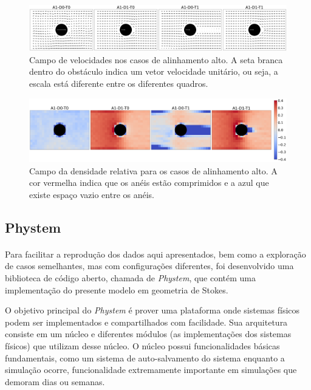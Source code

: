 \documentclass{article}
\theoremstyle{definition}
\begin{document}
\begin{figure}[h]
    \centering
    \includegraphics[width=\linewidth]{figuras/output_measurements/vel_high_align.png}
    \caption{Campo de velocidades nos casos de alinhamento alto. A seta branca dentro do obstáculo indica um vetor velocidade unitário, ou seja, a escala está diferente entre os diferentes quadros.}
    \label{fig:output_vel_high_align}
\end{figure}

\begin{figure}[h]
    \centering
    \includegraphics[width=\linewidth]{figuras/output_measurements/den_high_align.png}
    \caption{Campo da densidade relativa para os casos de alinhamento alto. A cor vermelha indica que os anéis estão comprimidos e a azul que existe espaço vazio entre os anéis.}
    \label{fig:output_rel_den_high_align}
\end{figure}

\FloatBarrier

\subsection{Phystem}
\paragraph{}
Para facilitar a reprodução dos dados aqui apresentados, bem como a exploração de casos semelhantes, mas com configurações diferentes, foi desenvolvido uma biblioteca de código aberto, chamada de \textit{Phystem}, que contém uma implementação do presente modelo em geometria de Stokes. 

O objetivo principal do \textit{Phystem} é prover uma plataforma onde sistemas físicos podem ser implementados e compartilhados com facilidade. Sua arquitetura consiste em um núcleo e diferentes módulos (as implementações dos sistemas físicos) que utilizam desse núcleo. O núcleo possui funcionalidades básicas fundamentais, como um sistema de auto-salvamento do sistema enquanto a simulação ocorre, funcionalidade extremamente importante em simulações que demoram dias ou semanas.
\end{document}
